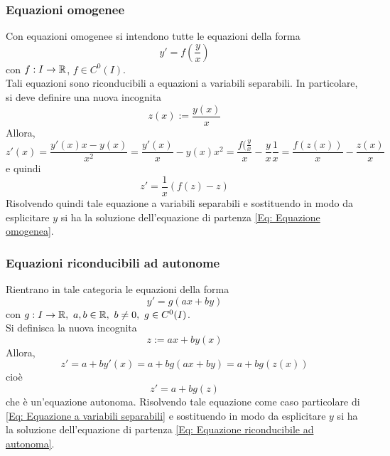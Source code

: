 \subsubsection{Equazioni omogenee}
Con equazioni omogenee si intendono tutte le equazioni della forma
\begin{equation}  \label{Eq: Equazione omogenea}
    y'=f\left(\frac{y}{x}\right)
\end{equation}
con $f:I \to \mathbb{R}$, $f \in C^0(I)$.\\
Tali equazioni sono riconducibili a equazioni a variabili separabili. In particolare, si deve definire una nuova incognita
\begin{equation}
    z(x):=\frac{y(x)}{x} 
\end{equation}
Allora,
\begin{equation}
    z'(x)=\frac{y'(x)x-y(x)}{x^2}=\frac{y'(x)}{x}-{y(x)}{x^2}= \frac{f(\tfrac{y}{x}}{x}-\frac{y}{x}\frac{1}{x}=\frac{f(z(x))}{x}-\frac{z(x)}{x}
\end{equation}
e quindi
\begin{equation}
    z'=\frac{1}{x}\left(f(z)-z\right)
\end{equation}
Risolvendo quindi tale equazione a variabili separabili e sostituendo in modo da esplicitare $y$ si ha la soluzione dell'equazione di partenza \eqref{Eq: Equazione omogenea}.
\subsubsection{Equazioni riconducibili ad autonome}
Rientrano in tale categoria le equazioni della forma
\begin{equation} \label{Eq: Equazione riconducibile ad autonoma}
    y'= g(ax+by)
\end{equation}
con $g:I \to \mathbb{R},\ a,b \in \mathbb{R},\ b \neq 0,\ g \in C^0(I)$.\\
Si definisca la nuova incognita 
\begin{equation}
    z:=ax+by(x)
\end{equation}
Allora,
\begin{equation}
    z'=a+by'(x) = a+bg(ax+by)=a+bg(z(x))
\end{equation}
cioè
\begin{equation}
    z'=a+bg(z)
\end{equation}
che è un'equazione autonoma. Risolvendo tale equazione come caso particolare di \eqref{Eq: Equazione a variabili separabili} e sostituendo in modo da esplicitare $y$ si ha la soluzione dell'equazione di partenza \eqref{Eq: Equazione riconducibile ad autonoma}.

